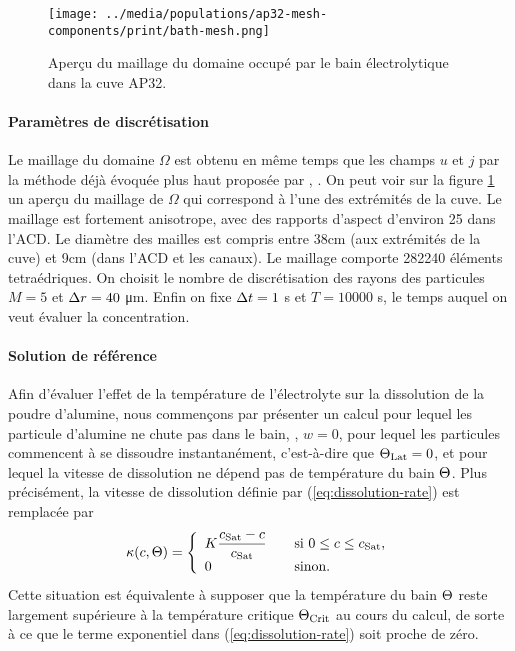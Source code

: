 \begin{figure}[t]
  \begin{center}
    \texttt{[image: ../media/populations/ap32-mesh-components/print/bath-mesh.png]}
    \caption{Aperçu du maillage du domaine occupé par le bain
      électrolytique dans la cuve AP32.}
    \label{fig:bath-mesh}
  \end{center}
\end{figure}

\paragraph{Paramètres de discrétisation}
Le maillage du domaine $\Omega$ est obtenu en même temps que les
champs $u$ et $j$ par la méthode déjà évoquée plus haut proposée par
\cite{Steiner2009}, \cite{Rochat2016}. On peut voir sur la figure
\ref{fig:bath-mesh} un aperçu du maillage de $\Omega$ qui correspond à
l'une des extrémités de la cuve. Le maillage est fortement anisotrope,
avec des rapports d'aspect d'environ \num{25} dans l'ACD. Le diamètre
des mailles est compris entre \num{38}\si{\centi\meter} (aux
extrémités de la cuve) et \num{9}\si{\centi\meter} (dans l'ACD et les
canaux). Le maillage comporte \num{282240} éléments tetraédriques. On
choisit le nombre de discrétisation des rayons des particules $M = 5$
et $\Delta r = \num{40}$ \si{\micro\meter}. Enfin on fixe $\Delta t = 1$
\si{\second} et $T = \num{10000}$ \si{\second}, le temps auquel on
veut évaluer la concentration.


\paragraph{Solution de référence} Afin d'évaluer l'effet de la
température de l'électrolyte sur la dissolution de la poudre
d'alumine, nous commençons par présenter un calcul pour lequel les
particule d'alumine ne chute pas dans le bain, \ie, $w = 0$, pour
lequel les particules commencent à se dissoudre instantanément,
c'est-à-dire que $\Theta_\text{Lat} = 0$, et pour lequel la
vitesse de dissolution ne dépend pas de température du bain
$\Theta$. Plus précisément, la vitesse de dissolution définie
par (\ref{eq:dissolution-rate}) est remplacée par
\begin{equation}
  \kappa(c, \Theta)= \left\{
  \begin{array}{ll}
    K\displaystyle\frac{c_\text{Sat} - c}{c_\text{Sat}} &\quad \text{si } 0\leq
    c \leq c_\text{Sat},\\
    0& \quad \text{sinon}.
  \end{array}
  \right.
\end{equation}
Cette situation est équivalente à supposer que la température du
bain $\Theta$ reste largement supérieure à la température
critique $\Theta_\text{Crit}$ au cours du calcul, de sorte à ce que le terme
exponentiel dans (\ref{eq:dissolution-rate}) soit proche de zéro.

